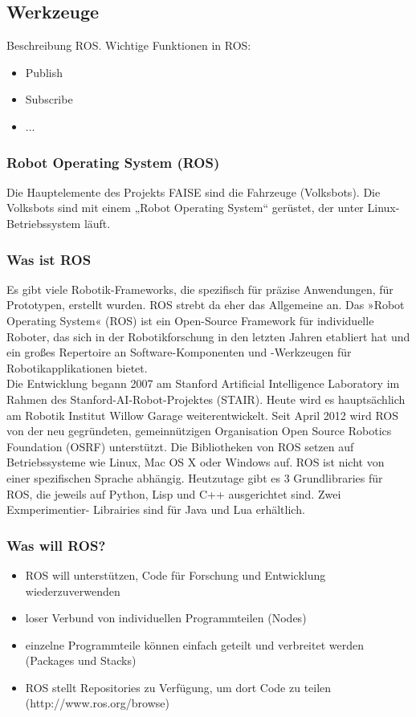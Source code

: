\subsection{Werkzeuge}
Beschreibung ROS. 
Wichtige Funktionen in ROS:
\begin{itemize}
\item Publish
\item Subscribe
\item ...
\end{itemize}
\subsubsection{Robot Operating System (ROS)}
Die Hauptelemente des Projekts FAISE sind die Fahrzeuge (Volksbots). Die Volksbots sind
mit einem „Robot Operating System“ gerüstet, der unter Linux- Betriebssystem läuft.
\subsubsection{Was ist ROS}
Es gibt viele Robotik-Frameworks, die spezifisch für präzise Anwendungen, für Prototypen,
erstellt wurden. ROS strebt da eher das Allgemeine an. Das »Robot Operating System«
(ROS) ist ein Open-Source Framework für individuelle Roboter, das sich in der
Robotikforschung in den letzten Jahren etabliert hat und ein großes Repertoire an Software-Komponenten und -Werkzeugen für Robotikapplikationen bietet.\\
Die Entwicklung begann 2007 am Stanford Artificial Intelligence Laboratory im Rahmen des
Stanford-AI-Robot-Projektes (STAIR). Heute wird es hauptsächlich am Robotik Institut Willow
Garage weiterentwickelt. Seit April 2012 wird ROS von der neu gegründeten,
gemeinnützigen Organisation Open Source Robotics Foundation (OSRF) unterstützt. Die
Bibliotheken von ROS setzen auf Betriebssysteme wie Linux, Mac OS X oder Windows auf.
ROS ist nicht von einer spezifischen Sprache abhängig. Heutzutage gibt es 3 Grundlibraries
für ROS, die jeweils auf Python, Lisp und C++ ausgerichtet sind. Zwei Exmperimentier-
Librairies sind für Java und Lua erhältlich.
\subsubsection{Was will ROS?}
\begin{itemize}
 \item ROS will unterstützen, Code für Forschung und Entwicklung wiederzuverwenden
 \item loser Verbund von individuellen Programmteilen (Nodes)
 \item einzelne Programmteile können einfach geteilt und verbreitet werden (Packages und Stacks)
 \item ROS stellt Repositories zu Verfügung, um dort Code zu teilen \cite{ROS:2014:Online}
(http://www.ros.org/browse)
\end{itemize}
